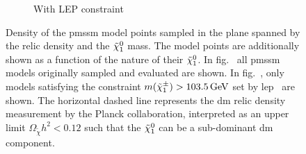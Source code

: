 \begin{figure}[h]
\begin{subfigure}[b]{0.49\linewidth}
		\caption{With LEP constraint\label{fig:relic_density_lsp_constraint}}
	\end{subfigure}\hfill
	\caption{Density of the \gls{pmssm} model points sampled in the plane spanned by the relic density and the $\tilde{\chi}_1^0$ mass. The model points are additionally shown as a function of the nature of their $\tilde{\chi}_1^0$. In fig.~ all \gls{pmssm} models originally sampled and evaluated are shown. In fig.~, only models satisfying the constraint $m(\charg) > \SI{103.5}{\GeV}$ set by \gls{lep}~\cite{lep_susy_results} are shown. The horizontal dashed line represents the \gls{dm} relic density measurement by the Planck collaboration, interpreted as an upper limit $\Omega_{\tilde{\chi}} h^2 < 0.12$ such that the $\tilde{\chi}_1^0$ can be a sub-dominant \gls{dm} component.}
	\label{fig:relic_density_lsp_withConstraint}
\end{figure}
